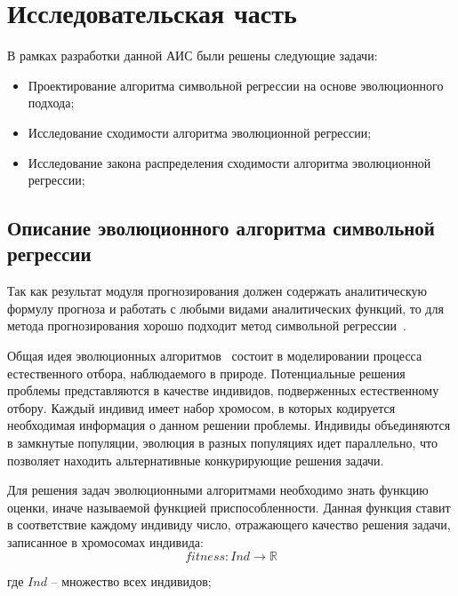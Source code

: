 \section{Исследовательская часть}

В рамках разработки данной АИС были решены следующие задачи:
\begin{itemize}
\item Проектирование алгоритма символьной регрессии на основе эволюционного подхода;
\item Исследование сходимости алгоритма эволюционной регрессии;
\item Исследование закона распределения сходимости алгоритма эволюционной регрессии;
\end{itemize}

\subsection{Описание эволюционного алгоритма символьной регрессии}

Так как результат модуля прогнозирования должен содержать аналитическую формулу прогноза и работать с любыми видами аналитических функций, то для метода прогнозирования хорошо подходит метод символьной регрессии~\cite{SymbolicRegression}.

Общая идея эволюционных алгоритмов~\cite{KozaTheBase} состоит в моделировании процесса естественного отбора, наблюдаемого в природе. Потенциальные решения проблемы представляются в качестве индивидов, подверженных естественному отбору. Каждый индивид имеет набор хромосом, в которых кодируется необходимая информация о данном решении проблемы. Индивиды объединяются в замкнутые популяции, эволюция в разных популяциях идет параллельно, что позволяет находить альтернативные конкурирующие решения задачи.

Для решения задач эволюционными алгоритмами необходимо знать функцию оценки, иначе называемой функцией приспособленности. Данная функция ставит в соответствие каждому индивиду число, отражающего качество решения задачи, записанное в хромосомах индивида:
\begin{equation}
\label{equation:fitness}
fitness : Ind \rightarrow \mathbb{R}
\end{equation}
\begin{ESKDExplanation}
\item[где ] $Ind$ -- множество всех индивидов;
\end{ESKDExplanation}

